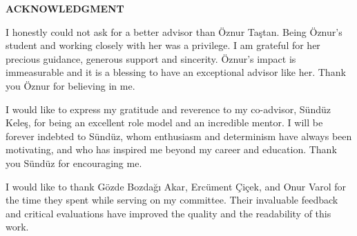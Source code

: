 \clearpage
\setlength{\parindent}{0pt}
\begin{center}
	\MakeUppercase{\textbf{acknowledgment}} \\ [3\baselineskip]
\end{center}

I honestly could not ask for a better advisor than Öznur Taştan.
Being Öznur's student and working closely with her was a privilege.
I am grateful for her precious guidance, generous support and sincerity.
Öznur's impact is immeasurable and it is a blessing to have an exceptional advisor like her.
Thank you Öznur for believing in me.

I would like to express my gratitude and reverence to my co-advisor, Sündüz Keleş, for being an excellent role model and an incredible mentor.
I will be forever indebted to Sündüz, whom enthusiasm and determinism have always been motivating, and who has inspired me beyond my career and education.
Thank you Sündüz for encouraging me.


I would like to thank Gözde Bozdağı Akar, Ercüment Çiçek, and Onur Varol for the time they spent while serving on my committee. Their invaluable feedback and critical evaluations have improved the quality and the readability of this work.



